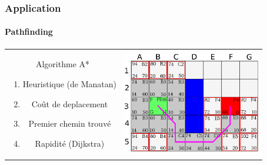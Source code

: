 	\begin{frame}
	\frametitle{Application}
	\framesubtitle{Pathfinding}
	
		\begin{tabular}{cc}
			\begin{minipage}{5cm}
				Algorithme A*
				\begin{enumerate}
					\item Heuristique (de Manatan)
					\item Coût de deplacement
					\item Premier chemin trouvé
					\item Rapidité (Dijkstra)
				\end{enumerate}
			\end{minipage} &
			\begin{minipage}{5cm}
				\includegraphics[width=6cm]{img/astar.png} 
			\end{minipage}\\
		\end{tabular}
	
	\end{frame}
	
